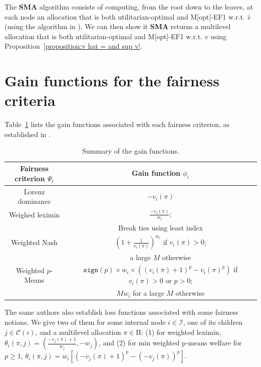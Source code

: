 \documentclass[]{article}
\newcommand{\children}{\mathcal{C}}
\newcommand{\internal}{\mathcal{I}}
\newcommand{\mallocations}{\mathrm{\Pi}}
\begin{document}
The \textbf{SMA} algorithm consists of computing, from the root down to the leaves, at each node an allocation that is both utilitarian-optimal and M{[opt]}-EF1 w.r.t. $\hat{v}$ (using the algorithm in \cite{Benabbou_et_al2021}). We can then show it \textbf{SMA} returns a multilevel allocation that is both utilitarian-optimal and M[opt]-EF1 w.r.t. $v$ using Proposition~\ref{proposition:v hat  = and sup v}. 

\section{Gain functions for the fairness criteria} \label{appendix: gain functions}

Table~\ref{tab:summary gain functions} lists the gain functions associated with each fairness criterion, as established in \cite{Viswanathan_Zick2023b}. 

\begin{table}[h!]
    \centering
    \caption{Summary of the gain functions.}
    \label{tab:summary gain functions}
    \begin{tabular}{|c|c|}
        \hline
        Fairness criterion $\Psi_i$ & Gain function $\phi_i$ \\
        \hline
        Lorenz dominance & $-v_i(\pi)$ \\
        \hline
        Weighed leximin & $\frac{-v_i(\pi)}{w_i}$; \\
        & Break ties using least index \\
        \hline
        Weighted Nash & $(1 + \frac{1}{v_i(\pi)})^{w_i}$ if $v_i(\pi) > 0$; \\
        & a large $M$ otherwise \\
        \hline
        Weighted $p$-Means & $\mathtt{sign}(p) \times w_i \times ((v_i(\pi)+1)^p - v_i(\pi)^p)$ if $v_i(\pi) > 0$ or $p > 0$; \\
        & $M w_i$ for a large $M$ otherwise \\
        \hline
    \end{tabular}
\end{table}

The same authors also establish loss functions associated with some fairness notions. We give two of them for some internal node $i \in \internal$, one of its children $j \in \children(i)$, and a multilevel allocation $\pi \in \mallocations$: (1) for weighted leximin, $\theta_i(\pi, j) = (\frac{-v_j(\pi) + 1}{w_j}, -w_j)$, and (2) for min weighted p-means welfare for $p \geq 1$, $\theta_i(\pi, j) = w_i[(-v_j(\pi) + 1)^p - (-v_j(\pi))^p]$.
\end{document}
